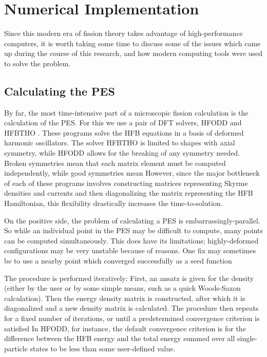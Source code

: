 \chapter{Numerical Implementation}\label{chap:Numerical}

Since this modern era of fission theory takes advantage of high-performance computers, it is worth taking some time to discuss some of the issues which came up during the course of this research, and how modern computing tools were used to solve the problem.

\section{Calculating the PES}
By far, the most time-intensive part of a microscopic fission calculation is the calculation of the PES. For this we use a pair of DFT solvers, HFODD \cite{Schunck2017} and HFBTHO \cite{Perez2017}. These programs solve the HFB equations in a basis of deformed harmonic oscillators. The solver HFBTHO is limited to shapes with axial symmetry, while HFODD allows for the breaking of any symmetry needed. Broken symmetries mean that each matrix element must be computed independently, while good symmetries mean However, since the major bottleneck of each of these programs involves constructing matrices representing Skyrme densities and currents and then diagonalizing the matrix representing the HFB Hamiltonian, this flexibility drastically increases the time-to-solution.

On the positive side, the problem of calculating a PES is embarrassingly-parallel. So while an individual point in the PES may be difficult to compute, many points can be computed simultaneously. This does have its limitations; highly-deformed configurations may be very unstable because of reasons. One fix may sometimes be to use a nearby point which converged successfully as a seed function

The procedure is performed iteratively: First, an ansatz is given for the density (either by the user or by some simple means, such as a quick Woods-Saxon calculation). Then the energy density matrix is constructed, after which it is diagonalized and a new density matrix is calculated. The procedure then repeats for a fixed number of iterations, or until a predetermined convergence criterion is satisfied In HFODD, for instance, the default convergence criterion is for the difference between the HFB energy and the total energy summed over all single-particle states to be less than some user-defined value.

